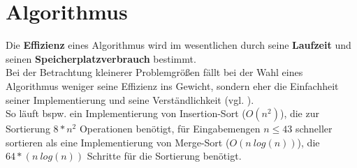 \section{Algorithmus}

Die \textbf{Effizienz} eines Algorithmus wird im wesentlichen durch seine \textbf{Laufzeit} und seinen \textbf{Speicherplatzverbrauch} bestimmt.\\

\noindent
Bei der Betrachtung kleinerer Problemgrößen fällt bei der Wahl eines Algorithmus weniger seine Effizienz ins Gewicht, sondern eher die Einfachheit seiner Implementierung und seine Verständlichkeit (vgl. \cite[5 f.]{GD18a}).\\
So läuft bspw. ein Implementierung von Insertion-Sort ($O(n^2)$), die zur Sortierung $8*n^2$ Operationen benötigt, für Eingabemengen $n \leq 43$ schneller sortieren als eine Implementierung von Merge-Sort ($O(n\ log(n))$), die $64 * (n\ log(n))$ Schritte für die Sortierung benötigt.